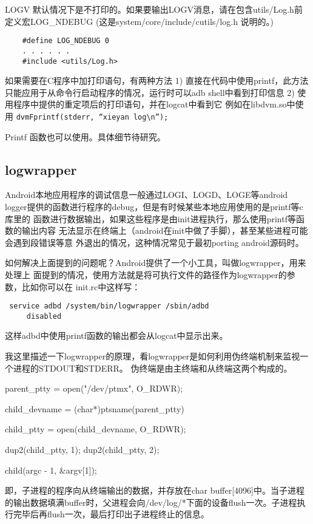 \documentclass[a4paper,titlepage]{article}
\begin{document}
LOGV 默认情况下是不打印的。如果要输出LOGV消息，请在包含utils/Log.h前定义宏LOG_NDEBUG
(这是system/core/include/cutils/log.h 说明的。)
\begin{lstlisting}
    #define LOG_NDEBUG 0
    . . . . . .
    #include <utils/Log.h>
\end{lstlisting}

如果需要在C程序中加打印语句，有两种方法
1)  直接在代码中使用printf，此方法只能应用于从命令行启动程序的情况，运行时可以adb shell中看到打印信息
2)  使用程序中提供的重定项后的打印语句，并在logcat中看到它
例如在libdvm.so中使用
\lstinline{dvmFprintf(stderr, “xieyan log\n”);}

Printf 函数也可以使用。具体细节待研究。



\subsection{logwrapper}\cite{logwrapper}
Android本地应用程序的调试信息一般通过LOGI、LOGD、LOGE等android
logger提供的函数进行程序的debug，但是有时候某些本地应用使用的是printf等c库里的
函数进行数据输出，如果这些程序是由init进程执行，那么使用printf等函数的输出内容
无法显示在终端上（android在init中做了手脚），甚至某些进程可能会遇到段错误等意
外退出的情况，这种情况常见于最初porting android源码时。

如何解决上面提到的问题呢？Android提供了一个小工具，叫做logwrapper，用来处理上
面提到的情况，使用方法就是将可执行文件的路径作为logwrapper的参数，比如你可以在
init.rc中这样写：
\begin{lstlisting}
 service adbd /system/bin/logwrapper /sbin/adbd 
     disabled 
 \end{lstlisting}

这样adbd中使用printf函数的输出都会从logcat中显示出来。

我这里描述一下logwrapper的原理，看logwrapper是如何利用伪终端机制来监视一个进程的STDOUT和STDERR。
伪终端是由主终端和从终端这两个构成的。
\begin{description}[nolistsep]
    \item [logwrapper打开主终端]
        parent_ptty = open("/dev/ptmx", O_RDWR);

    \item [获取从终端的名字] 
        child_devname = (char*)ptsname(parent_ptty) 

    \item [fork子进程，然后在子进程中打开从终端] 
        child_ptty = open(child_devname, O_RDWR);

    \item [接下来，把子进程的STDOUT和STDERR重定向到从终端] 
        dup2(child_ptty, 1); 
        dup2(child_ptty, 2); 

    \item [最后，调用child函数运行程序] 
        child(argc - 1, \&argv[1]);

    \item [父进程最后调用parent()函数并进入循环读取主终端中的数据] 
        即，子进程的程序向从终端输出的数据，并存放在char buffer[4096]中。当子进程
        的输出数据填满buffer时，父进程会向/dev/log/*下面的设备flush一次。子进程执
        行完毕后再flush一次，最后打印出子进程终止的信息。
\end{description}
\end{document}

